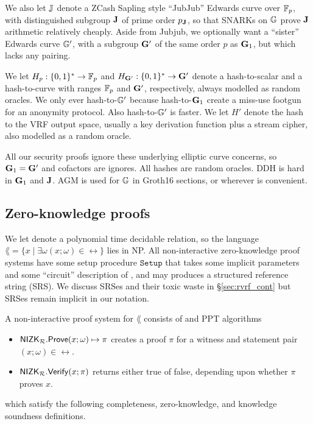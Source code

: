 We also let ${\mathbb{J}}$ denote a ZCash Sapling style ``JubJub'' Edwards curve
over $\mathbb{F}_p$, with distinguished subgroup ${\mathbf{J}}$ of prime order $p_{\mathbf{J}}$, so that
SNARKs on ${\mathbb{G}}$ prove ${\mathbf{J}}$ arithmetic relatively cheaply.
Aside from Jubjub, we optionally want a ``sister'' Edwards curve ${\mathbb{G}'}$,
with a subgroup ${\mathbf{G}}'$ of the same order $p$ as ${\mathbf{G}}_1$,
 but which lacks any pairing.

We let $H_p : \{0,1\}^* \to \mathbb{F}_p$ and $H_{{\mathbf{G}'}} : \{0,1\}^* \to {\mathbf{G}'}$
denote a hash-to-scalar and a hash-to-curve  with ranges
$\mathbb{F}_p$ and ${\mathbf{G}'}$, respectively, always modelled as random oracles.  
We only ever hash-to-${\mathbb{G}'}$ because hash-to-${\mathbf{G}}_1$ create a miss-use
footgun for an anonymity protocol.  Also hash-to-${\mathbb{G}'}$ is faster.
We let $H'$ denote the hash to the VRF output space, usually
 a key derivation function plus a stream cipher, also modelled as a random oracle.

All our security proofs ignore these underlying elliptic curve concerns,
so ${\mathbf{G}}_1 = {\mathbf{G}'}$ and cofactors are ignores.
All hashes are random oracles.  DDH is hard in ${\mathbf{G}}_1$ and ${\mathbf{J}}$.
AGM is used for ${\mathbb{G}}$ in Groth16 sections, or wherever is convenient. 

\subsection{Zero-knowledge proofs}
\label{subsec:zkp_background}

% 

We let \rel denote a polynomial time decidable relation, so the language
$\lang = \{x \mid \exists \omega (x; \omega) \in \rel \}$ lies in NP.
All non-interactive zero-knowledge proof systems have some setup procedure
$\mathtt{Setup}$ that takes some implicit parameters and some ``circuit''
description of \rel, and may produces a structured reference string (SRS).
We discuss SRSes and their toxic waste in \S\ref{sec:rvrf_cont} but
SRSes remain implicit in our notation.

A non-interactive proof system for $\lang$ consists of \Prove and \Verify PPT algorithms
\begin{itemize}
\item ${\mathsf{NIZK}}_\mathcal{R}.{\mathsf{Prove}}(x; \omega) \mapsto \pi$ creates a proof $\pi$ for a witness and statement pair $(x; \omega) \in \rel$.
\item ${\mathsf{NIZK}}_\mathcal{R}.{\mathsf{Verify}}(x; \pi)$ returns either true of false, depending upon whether $\pi$  proves $x$.
\end{itemize}	
which satisfy the following completeness, zero-knowledge, and knowledge soundness definitions.

